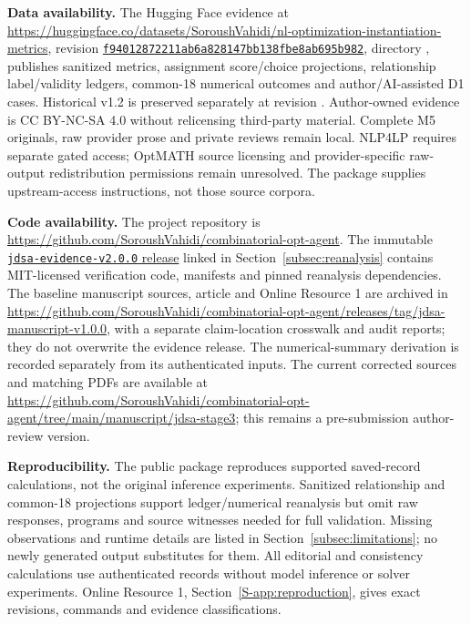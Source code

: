 \documentclass[pdflatex,iicol,sn-basic,Numbered]{sn-jnl}
\begin{document}
\noindent\textbf{Data availability.} The Hugging Face evidence at \url{https://huggingface.co/datasets/SoroushVahidi/nl-optimization-instantiation-metrics}, revision \href{https://huggingface.co/datasets/SoroushVahidi/nl-optimization-instantiation-metrics/tree/f94012872211ab6a828147bb138fbe8ab695b982/releases/jdsa-evidence-v2.0.0}{\nolinkurl{f94012872211ab6a828147bb138fbe8ab695b982}}, directory , publishes sanitized metrics, assignment score/choice projections, relationship label/validity ledgers, common-18 numerical outcomes and author/AI-assisted D1 cases. Historical v1.2 is preserved separately at revision . Author-owned evidence is CC BY-NC-SA 4.0 without relicensing third-party material. Complete M5 originals, raw provider prose and private reviews remain local. NLP4LP requires separate gated access; OptMATH source licensing and provider-specific raw-output redistribution permissions remain unresolved. The package supplies upstream-access instructions, not those source corpora.

\noindent\textbf{Code availability.} The project repository is \url{https://github.com/SoroushVahidi/combinatorial-opt-agent}. The immutable \hyperref[subsec:reanalysis]{\texttt{jdsa-evidence-v2.0.0} release} linked in Section~\ref{subsec:reanalysis} contains MIT-licensed verification code, manifests and pinned reanalysis dependencies. The baseline manuscript sources, article and Online Resource 1 are archived in \url{https://github.com/SoroushVahidi/combinatorial-opt-agent/releases/tag/jdsa-manuscript-v1.0.0}, with a separate claim-location crosswalk and audit reports; they do not overwrite the evidence release. The numerical-summary derivation is recorded separately from its authenticated inputs. The current corrected sources and matching PDFs are available at \url{https://github.com/SoroushVahidi/combinatorial-opt-agent/tree/main/manuscript/jdsa-stage3}; this remains a pre-submission author-review version.

\noindent\textbf{Reproducibility.} The public package reproduces supported saved-record calculations, not the original inference experiments. Sanitized relationship and common-18 projections support ledger/numerical reanalysis but omit raw responses, programs and source witnesses needed for full validation. Missing observations and runtime details are listed in Section~\ref{subsec:limitations}; no newly generated output substitutes for them. All editorial and consistency calculations use authenticated records without model inference or solver experiments. Online Resource 1, Section~\ref{S-app:reproduction}, gives exact revisions, commands and evidence classifications.
\end{document}
